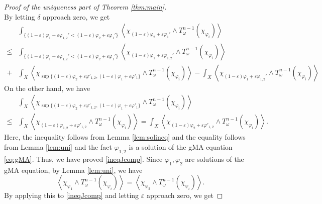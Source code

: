 \documentclass[10pt,a4paper]{amsart}
\numberwithin{equation}{section}
\begin{document}
\begin{proof}[Proof of the uniqueness part of Theorem \ref{thm:main}]
\begin{equation*}
    \end{equation*}
    By letting $\delta$ approach zero, we get
    \begin{equation*}
        \begin{split}
            &\int_{\{(1-\varepsilon)\varphi_1+\varepsilon\varphi_{1,2}'<(1-\varepsilon)\varphi_2+\varepsilon\varphi_1'\}}\left\langle\chi_{(1-\varepsilon)\varphi_2+\varepsilon\varphi_1'}\wedge T^{n-1}_\omega(\chi_{\varphi_i})\right\rangle\\
        \le &\int_{\{(1-\varepsilon)\varphi_1+\varepsilon\varphi_{1,2}'<(1-\varepsilon)\varphi_2+\varepsilon\varphi_1'\}}\left\langle\chi_{(1-\varepsilon)\varphi_1+\varepsilon\varphi_{1,2}'}\wedge T^{n-1}_\omega(\chi_{\varphi_i})\right\rangle\\
        +&\int_X \left\langle\chi_{\sup\{(1-\varepsilon)\varphi_2+\varepsilon\varphi'_{1,2},(1-\varepsilon)\varphi_1+\varepsilon\varphi'_1\}}\wedge T^{n-1}_\omega(\chi_{\varphi_i})\right\rangle
        -\int_X\left\langle\chi_{(1-\varepsilon)\varphi_1+\varepsilon\varphi_{1,2}'}\wedge T^{n-1}_\omega(\chi_{\varphi_i})\right\rangle
        \end{split}
    \end{equation*}
    On the other hand, we have
    \begin{equation*}
        \begin{split}
            &\int_X \left\langle\chi_{\sup\{(1-\varepsilon)\varphi_2+\varepsilon\varphi'_{1,2},(1-\varepsilon)\varphi_1+\varepsilon\varphi'_1\}}\wedge T^{n-1}_\omega(\chi_{\varphi_i})\right\rangle\\
            \le&\int_X \left\langle\chi_{(1-\varepsilon)\varphi_{1,2}+\varepsilon\varphi'_{1,2}}\wedge T^{n-1}_\omega(\chi_{\varphi_i})\right\rangle
            =\int_X \left\langle\chi_{(1-\varepsilon)\varphi_2+\varepsilon\varphi'_{1,2}}\wedge T^{n-1}_\omega(\chi_{\varphi_i})\right\rangle.
        \end{split}
    \end{equation*}
    Here, the inequality follows from Lemma \ref{lem:solineq} and the equality follows from Lemma \ref{lem:uni} and the fact $\varphi_{1,2}$ is a solution of the gMA equation \eqref{eq:gMA}. Thus, we have proved \eqref{ineqJcomp}. Since $\varphi_1,\varphi_2$ are solutions of the gMA equation, by Lemma \ref{lem:uni}, we have
    $$\left\langle\chi_{\varphi_1}\wedge T^{n-1}_\omega(\chi_{\varphi_i})\right\rangle=\left\langle\chi_{\varphi_2}\wedge  T^{n-1}_\omega(\chi_{\varphi_i})\right\rangle.$$
    By applying this to \eqref{ineqJcomp} and letting $\varepsilon$ approach zero, we get

\end{proof}
\end{document}
